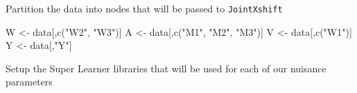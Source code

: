 \documentclass[
]{article}
\newenvironment{Shaded}{\begin{snugshade}}{\end{snugshade}}
\newcommand{\FunctionTok}[1]{\textcolor[rgb]{0.00,0.00,0.00}{#1}}
\newcommand{\NormalTok}[1]{#1}
\newcommand{\OtherTok}[1]{\textcolor[rgb]{0.56,0.35,0.01}{#1}}
\newcommand{\SpecialCharTok}[1]{\textcolor[rgb]{0.00,0.00,0.00}{#1}}
\newcommand{\StringTok}[1]{\textcolor[rgb]{0.31,0.60,0.02}{#1}}
\begin{document}
\begin{Shaded}
\end{Shaded}

Partition the data into nodes that will be passed to \texttt{JointXshift}

\begin{Shaded}
\begin{Highlighting}[]

\NormalTok{W }\OtherTok{\textless{}{-}}\NormalTok{ data[,}\FunctionTok{c}\NormalTok{(}\StringTok{"W2"}\NormalTok{, }\StringTok{"W3"}\NormalTok{)]}
\NormalTok{A }\OtherTok{\textless{}{-}}\NormalTok{ data[,}\FunctionTok{c}\NormalTok{(}\StringTok{"M1"}\NormalTok{, }\StringTok{"M2"}\NormalTok{, }\StringTok{"M3"}\NormalTok{)]}
\NormalTok{V }\OtherTok{\textless{}{-}}\NormalTok{ data[,}\FunctionTok{c}\NormalTok{(}\StringTok{"W1"}\NormalTok{)]}
\NormalTok{Y }\OtherTok{\textless{}{-}}\NormalTok{ data[,}\StringTok{"Y"}\NormalTok{]}
\end{Highlighting}
\end{Shaded}

Setup the Super Learner libraries that will be used for each of our
nuisance parameters
\end{document}
